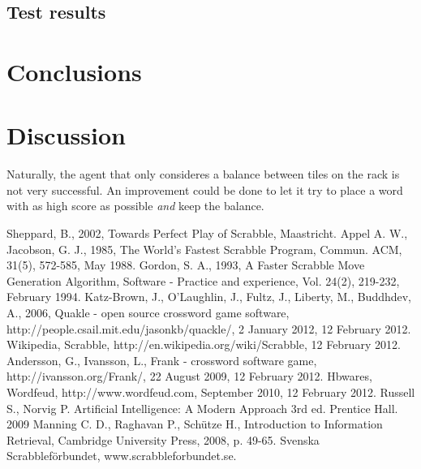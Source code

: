 \documentclass[a4paper, 12pt]{report}
\begin{document}
\section{Test results}
\chapter{Conclusions}
\chapter{Discussion}
Naturally, the agent that only consideres a balance between tiles on the rack is not very successful. An improvement could be done to let it try to place a word with as high score as possible \emph{and} keep the balance. 

\begin{thebibliography}{100}  
   Sheppard, B., 2002, Towards Perfect Play of Scrabble, Maastricht.
   Appel A. W., Jacobson, G. J., 1985, The World’s Fastest Scrabble Program, Commun. ACM, 31(5), 572-585, May 1988.
 Gordon, S. A., 1993, A Faster Scrabble Move Generation Algorithm, Software - Practice and experience, Vol. 24(2), 219-232, February 1994.
 Katz-Brown, J., O’Laughlin, J., Fultz, J., Liberty, M., Buddhdev, A., 2006, Quakle - open source crossword game software, http://people.csail.mit.edu/jasonkb/quackle/, 2 January 2012,  12 February 2012.
 Wikipedia, Scrabble, http://en.wikipedia.org/wiki/Scrabble, 12 February 2012.
 Andersson, G., Ivansson, L., Frank - crossword software game, http://ivansson.org/Frank/, 22 August 2009, 12 February 2012.
 Hbwares, Wordfeud, http://www.wordfeud.com, September 2010, 12 February 2012.
 Russell S., Norvig P. Artificial Intelligence: A Modern Approach 3rd ed. Prentice Hall. 2009
 Manning C. D., Raghavan P., Schütze H., Introduction to Information Retrieval, Cambridge University Press, 2008, p. 49-65.
 Svenska Scrabbleförbundet, www.scrabbleforbundet.se.
\end{thebibliography}
\end{document}
